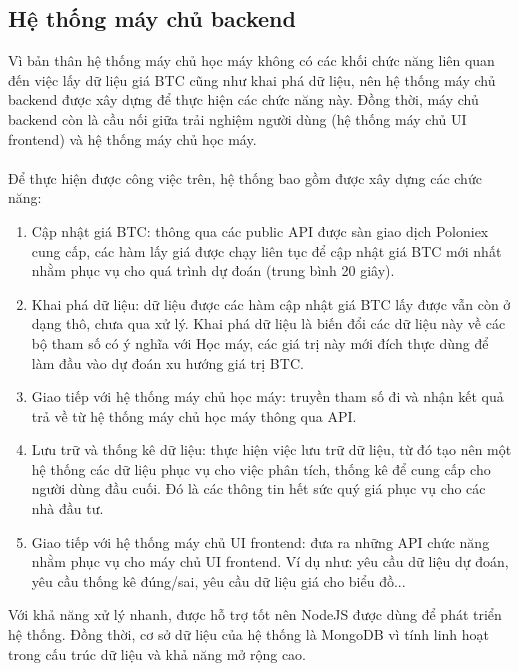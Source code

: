 \subsection{ Hệ thống máy chủ backend}
Vì bản thân hệ thống máy chủ học máy không có các khối chức năng liên quan đến 
việc lấy dữ liệu giá BTC cũng như khai phá dữ liệu, nên hệ thống máy chủ backend 
được xây dựng để thực hiện các chức năng này. Đồng thời, máy chủ backend còn là 
cầu nối giữa trải nghiệm người dùng (hệ thống máy chủ UI frontend) và hệ thống 
máy chủ học máy.\\\\
Để thực hiện được công việc trên, hệ thống bao gồm được xây dựng các chức năng:
\begin{enumerate}
\item Cập nhật giá BTC: thông qua các public API được sàn giao dịch Poloniex 
cung cấp, các hàm lấy giá được chạy liên tục để cập nhật giá BTC mới nhất nhằm 
phục vụ cho quá trình dự đoán (trung bình 20 giây).
\item Khai phá dữ liệu: dữ liệu được các hàm cập nhật giá BTC lấy được vẫn 
còn ở dạng thô, chưa qua xử lý. Khai phá dữ liệu là biến đổi các dữ liệu này 
về các bộ tham số có ý nghĩa với Học máy, các giá trị này mới đích thực 
dùng để làm đầu vào dự đoán xu hướng giá trị BTC.
\item Giao tiếp với hệ thống máy chủ học máy: truyền tham số đi và nhận 
kết quả trả về từ hệ thống máy chủ học máy thông qua API.
\item Lưu trữ và thống kê dữ liệu: thực hiện việc lưu trữ dữ liệu, từ đó tạo 
nên một hệ thống các dữ liệu phục vụ cho việc phân tích, thống kê để cung cấp 
cho người dùng đầu cuối. Đó là các thông tin hết sức quý giá phục vụ cho các 
nhà đầu tư.
\item Giao tiếp với hệ thống máy chủ UI frontend: đưa ra những API chức năng 
nhằm phục vụ cho máy chủ UI frontend. Ví dụ như: yêu cầu dữ liệu dự đoán, yêu 
cầu thống kê đúng/sai, yêu cầu dữ liệu giá cho biểu đồ...
\end{enumerate}
Với khả năng xử lý nhanh, được hỗ trợ tốt nên NodeJS được dùng để phát triển 
hệ thống. Đồng thời, cơ sở dữ liệu của hệ thống là MongoDB vì tính linh hoạt 
trong cấu trúc dữ liệu và khả năng mở rộng cao.
